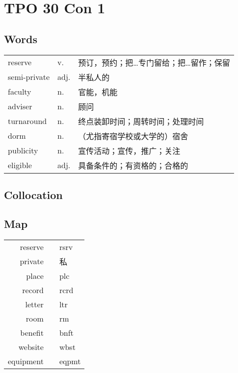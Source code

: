 \section{TPO 30 Con 1}

\subsection{Words}

\begin{tabular}{lll}
    reserve      & v.   & 预订，预约；把…专门留给；把…留作；保留 \\
    semi-private & adj. & 半私人的                 \\
    faculty      & n.   & 官能，机能                \\
    adviser      & n.   & 顾问                   \\
    turnaround   & n.   & 终点装卸时间；周转时间；处理时间     \\
    dorm         & n.   & （尤指寄宿学校或大学的）宿舍       \\
    publicity    & n.   & 宣传活动；宣传，推广；关注        \\
    eligible     & adj. & 具备条件的；有资格的；合格的       \\
\end{tabular}

\subsection{Collocation}

\subsection{Map}

\begin{tabular}{rc@{\quad$\to$\quad}l}
    reserve   &  & rsrv  \\
    private   &  & 私     \\
    place     &  & plc   \\
    record    &  & rcrd  \\
    letter    &  & ltr   \\
    room      &  & rm    \\
    benefit   &  & bnft  \\
    website   &  & wbst  \\
    equipment &  & eqpmt \\
\end{tabular}

\newpage
